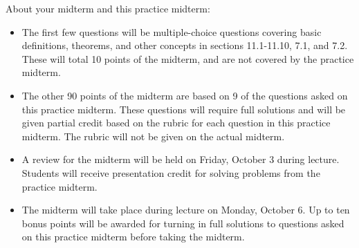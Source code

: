 \documentclass[12pt]{exam}
\begin{document}
\begin{center}
\end{center}
\vspace{0.1in}

\vspace{12pt}

\noindent About your midterm and this practice midterm:
\begin{itemize}
  \item
    The first few questions will be multiple-choice questions
    covering basic definitions, theorems, and other concepts in sections
    11.1-11.10, 7.1, and 7.2.
    These will total 10 points of the midterm, and are not covered
    by the practice midterm.
  \item
    The other 90 points of the midterm are based on 9 of the questions
    asked on this practice midterm. These questions will require full solutions
    and will be given partial credit based on the rubric for each question
    in this practice midterm. The rubric will not be given on the actual
    midterm.
  \item
    A review for the midterm will be held on Friday, October 3 during lecture.
    Students will receive presentation credit for solving problems from the
    practice midterm.
  \item
    The midterm will take place during lecture on Monday, October 6. Up to
    ten bonus points will be awarded for turning in full solutions to questions
    asked on this practice midterm before taking the midterm.
\end{itemize}

\newpage
\end{document}

